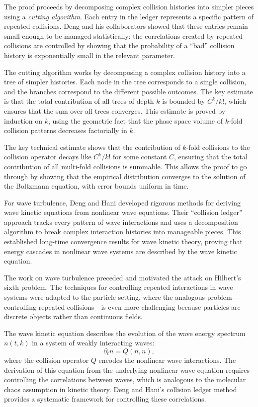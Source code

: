 The proof proceeds by decomposing complex collision histories into simpler pieces using a \emph{cutting algorithm}. Each entry in the ledger represents a specific pattern of repeated collisions. Deng and his collaborators showed that these entries remain small enough to be managed statistically: the correlations created by repeated collisions are controlled by showing that the probability of a ``bad'' collision history is exponentially small in the relevant parameter.

The cutting algorithm works by decomposing a complex collision history into a tree of simpler histories. Each node in the tree corresponds to a single collision, and the branches correspond to the different possible outcomes. The key estimate is that the total contribution of all trees of depth $k$ is bounded by $C^k/k!$, which ensures that the sum over all trees converges. This estimate is proved by induction on $k$, using the geometric fact that the phase space volume of $k$-fold collision patterns decreases factorially in $k$.

The key technical estimate shows that the contribution of $k$-fold collisions to the collision operator decays like $C^k/k!$ for some constant $C$, ensuring that the total contribution of all multi-fold collisions is summable. This allows the proof to go through by showing that the empirical distribution converges to the solution of the Boltzmann equation, with error bounds uniform in time.

For wave turbulence, Deng and Hani developed rigorous methods for deriving wave kinetic equations from nonlinear wave equations. Their ``collision ledger'' approach tracks every pattern of wave interactions and uses a decomposition algorithm to break complex interaction histories into manageable pieces. This established long-time convergence results for wave kinetic theory, proving that energy cascades in nonlinear wave systems are described by the wave kinetic equation.

The work on wave turbulence preceded and motivated the attack on Hilbert's sixth problem. The techniques for controlling repeated interactions in wave systems were adapted to the particle setting, where the analogous problem---controlling repeated collisions---is even more challenging because particles are discrete objects rather than continuous fields.

The wave kinetic equation describes the evolution of the wave energy spectrum $n(t,k)$ in a system of weakly interacting waves:
\[
\partial_t n = Q(n,n),
\]
where the collision operator $Q$ encodes the nonlinear wave interactions. The derivation of this equation from the underlying nonlinear wave equation requires controlling the correlations between waves, which is analogous to the molecular chaos assumption in kinetic theory. Deng and Hani's collision ledger method provides a systematic framework for controlling these correlations.

